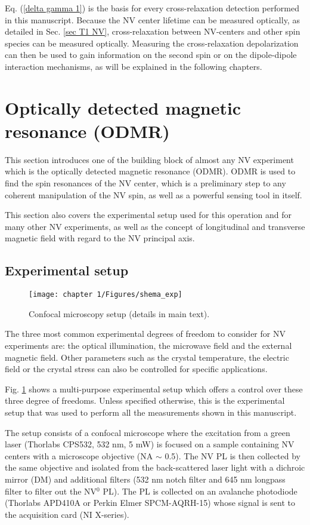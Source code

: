 \documentclass[a4paper, 11pt]{report}
\begin{document}
Eq. (\ref{delta gamma 1}) is the basis for every cross-relaxation detection performed in this manuscript. Because the NV center lifetime can be measured optically, as detailed in Sec. \ref{sec T1 NV}, cross-relaxation between NV-centers and other spin species can be measured optically. Measuring the cross-relaxation depolarization can then be used to gain information on the second spin or on the dipole-dipole interaction mechanisms, as will be explained in the following chapters.

\section{Optically detected magnetic resonance (ODMR)}

This section introduces one of the building block of almost any NV experiment which is the optically detected magnetic resonance (ODMR). ODMR is used to find the spin resonances of the NV center, which is a preliminary step to any coherent manipulation of the NV spin, as well as a powerful sensing tool in itself.

This section also covers the experimental setup used for this operation and for many other NV experiments, as well as the concept of longitudinal and transverse magnetic field with regard to the NV principal axis.

\subsection{Experimental setup}
\label{Sec setup cahp 1}
\begin{figure}[h!]
\centering
\texttt{[image: chapter 1/Figures/shema\_exp]}
\caption{Confocal microscopy setup (details in main text).}
\label{setup ch1}
\end{figure}
The three most common experimental degrees of freedom to consider for NV experiments are: the optical illumination, the microwave field and the external magnetic field. Other parameters such as the crystal temperature, the electric field or the crystal stress can also be controlled for specific applications.

Fig. \ref{setup ch1} shows a multi-purpose experimental setup which offers a control over these three degree of freedoms. Unless specified otherwise, this is the experimental setup that was used to perform all the measurements shown in this manuscript. 

The setup consists of a confocal microscope where the excitation from a green laser (Thorlabs CPS532, 532 nm, 5 mW) is focused on a sample containing NV centers with a microscope objective (NA $\sim$ 0.5). The NV PL is then collected by the same objective and isolated from the back-scattered laser light with a dichroic mirror (DM) and additional filters (532 nm notch filter and 645 nm longpass filter to filter out the NV$^0$ PL). The PL is collected on an avalanche photodiode (Thorlabs APD410A or Perkin Elmer SPCM-AQRH-15) whose signal is sent to the acquisition card (NI X-series).
\end{document}

